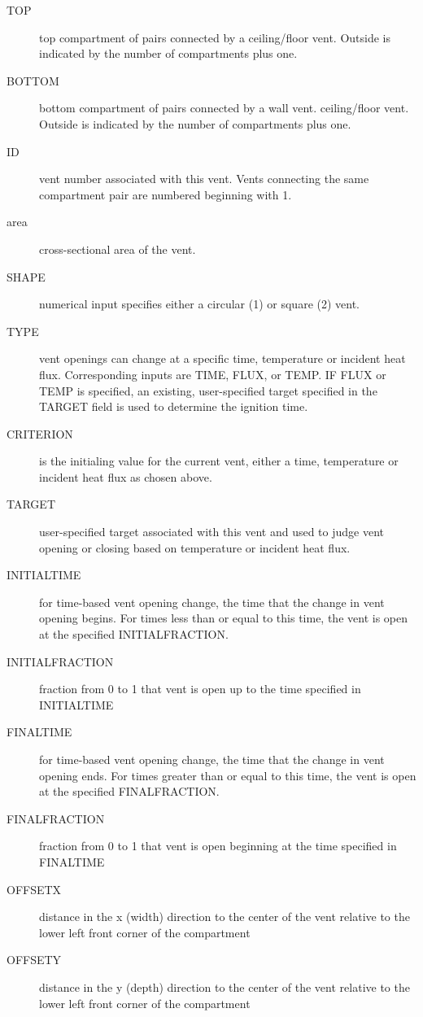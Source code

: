 \begin{adjustwidth}{1cm}{0cm}
\begin{description}
  \item[TOP] top compartment of pairs connected by a ceiling/floor vent. Outside is indicated by the number of compartments plus one.
  \item[BOTTOM] bottom compartment of pairs connected by a wall vent. ceiling/floor vent. Outside is indicated by the number of compartments plus one.
  \item[ID] vent number associated with this vent. Vents connecting the same compartment pair are numbered beginning with 1.
  \item[area] cross-sectional area of the vent.
  \item[SHAPE] numerical input specifies either a circular (1) or square (2) vent.
  \item[TYPE] vent openings can change at a specific time, temperature or incident heat flux. Corresponding inputs are TIME, FLUX, or TEMP.  IF FLUX or TEMP is specified, an existing, user-specified target specified in the TARGET field is used to determine the ignition time.
  \item[CRITERION] is the initialing value for the current vent, either a time, temperature or incident heat flux as chosen above.
  \item[TARGET] user-specified target associated with this vent and used to judge vent opening or closing based on temperature or incident heat flux.
  \item[INITIALTIME] for time-based vent opening change, the time that the change in vent opening begins. For times less than or equal to this time, the vent is open at the specified INITIALFRACTION.
  \item[INITIALFRACTION] fraction from 0 to 1 that vent is open up to the time specified in INITIALTIME
  \item[FINALTIME] for time-based vent opening change, the time that the change in vent opening ends. For times greater than or equal to this time, the vent is open at the specified FINALFRACTION.
  \item[FINALFRACTION] fraction from 0 to 1 that vent is open beginning at the time specified in FINALTIME
  \item[OFFSETX] distance in the x (width) direction to the center of the vent relative to the lower left front corner of the compartment
  \item[OFFSETY] distance in the y (depth) direction to the center of the vent relative to the lower left front corner of the compartment
\end{description}
\end{adjustwidth}

